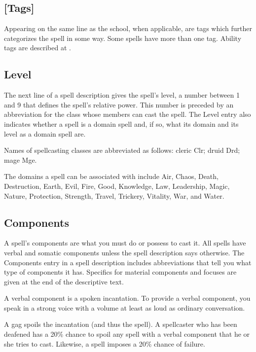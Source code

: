     \subsection{[Tags]}
        Appearing on the same line as the school, when applicable, are tags which further categorizes the spell in some way.
        Some spells have more than one tag.
        Ability tags are described at .

    \subsection{Level}
        The next line of a spell description gives the spell's level, a number between 1 and 9 that defines the spell's relative power.
        This number is preceded by an abbreviation for the class whose members can cast the spell.
        The Level entry also indicates whether a spell is a domain spell and, if so, what its domain and its level as a domain spell are.

        Names of spellcasting classes are abbreviated as follows: cleric Clr; druid Drd; mage Mge.

        The domains a spell can be associated with include Air, Chaos, Death, Destruction, Earth, Evil, Fire, Good, Knowledge, Law, Leadership, Magic, Nature, Protection, Strength, Travel, Trickery, Vitality, War, and Water.

    \subsection{Components}\label{Components}
        A spell's components are what you must do or possess to cast it.
        All spells have verbal and somatic components unless the spell description says otherwise.
        The Components entry in a spell description includes abbreviations that tell you what type of components it has.
        Specifics for material components and focuses are given at the end of the descriptive text.

         A verbal component is a spoken incantation.
        To provide a verbal component, you speak in a strong voice with a volume at least as loud as ordinary conversation.

        A gag spoils the incantation (and thus the spell). A spellcaster who has been deafened has a 20\% chance to spoil any spell with a verbal component that he or she tries to cast.
        Likewise, a  spell imposes a 20\% chance of failure.

